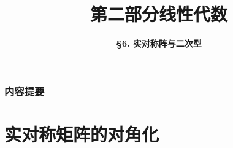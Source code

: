 



\title[Linear Algebra]{\LARGE \bfseries 第二部分\quad 线性代数} %
\author[Real Symmetric Matrix and Quadratic Form] %
{\Large \bfseries \S 6. 实对称阵与二次型}
\date{}






\begin{frame}

\titlepage %

\end{frame}


\begin{frame}
\frametitle{内容提要} %
\tableofcontents %
\end{frame}



\section{实对称矩阵的对角化}


